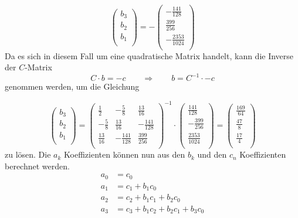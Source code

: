 \begin{beispiel}
\[\begin{pmatrix}
b_{3}\\
b_{2}\\
b_{1}\\
\end{pmatrix}
=
-
\begin{pmatrix}
-\frac{141}{128}\\
\frac{399}{256}\\
-\frac{2353}{1024}\\
\end{pmatrix}
\]
Da es sich in diesem Fall um eine quadratische Matrix handelt,
kann die Inverse der $C$-Matrix 
\begin{equation}
C\cdot b = -c
\qquad\Rightarrow\qquad
b = C^{-1} \cdot -c
\end{equation}
genommen werden, um die Gleichung 

\[
\renewcommand\arraystretch{1.25}
\begin{pmatrix}
b_{3}\\
b_{2}\\
b_{1}\\
\end{pmatrix}
=
\begin{pmatrix}
\frac{1}{2} & -\frac{5}{8} & \frac{13}{16}\\
-\frac{5}{8} & \frac{13}{16}& -\frac{141}{128}\\
\frac{13}{16} & -\frac{141}{128} & \frac{399}{256} \\
\end{pmatrix}^{-1}
\cdot
\begin{pmatrix}
\frac{141}{128}\\
-\frac{399}{256}\\
\frac{2353}{1024}\\
\end{pmatrix}
=
\begin{pmatrix}
\frac{169}{64}\\
\frac{47}{8}\\
\frac{17}{4}\\
\end{pmatrix}
\]
zu lösen.
Die $a_k$ Koeffizienten können nun aus den $b_k$ und den $c_n$ Koeffizienten berechnet werden.
\begin{equation}
\renewcommand\arraystretch{1.25}
\begin{aligned}
a_{0}&=c_{0} \\
a_{1}&=c_{1}+b_{1} c_{0} \\
a_{2}&=c_{2}+b_{1} c_{1}+b_{2} c_{0} \\
a_{3}&=c_{3}+b_{1} c_{2}+b_{2} c_{1} + b_{3} c_{0} 
\end{aligned}

\end{equation}
\end{beispiel}
